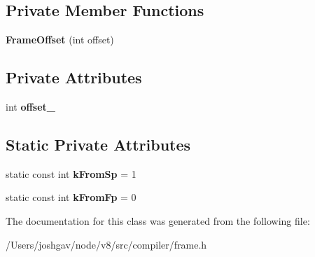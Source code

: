 \subsection*{Private Member Functions}
\begin{DoxyCompactItemize}
\item 
{\bfseries Frame\+Offset} (int offset)\hypertarget{classv8_1_1internal_1_1compiler_1_1_frame_offset_af4e4b2bb0e3c6df88aced1fdcfed68ff}{}\label{classv8_1_1internal_1_1compiler_1_1_frame_offset_af4e4b2bb0e3c6df88aced1fdcfed68ff}

\end{DoxyCompactItemize}
\subsection*{Private Attributes}
\begin{DoxyCompactItemize}
\item 
int {\bfseries offset\+\_\+}\hypertarget{classv8_1_1internal_1_1compiler_1_1_frame_offset_ae65fbe7ead773cd74c65bfcc71a61fb4}{}\label{classv8_1_1internal_1_1compiler_1_1_frame_offset_ae65fbe7ead773cd74c65bfcc71a61fb4}

\end{DoxyCompactItemize}
\subsection*{Static Private Attributes}
\begin{DoxyCompactItemize}
\item 
static const int {\bfseries k\+From\+Sp} = 1\hypertarget{classv8_1_1internal_1_1compiler_1_1_frame_offset_a76b301a59a61d610f7b9d41bd58b7dc1}{}\label{classv8_1_1internal_1_1compiler_1_1_frame_offset_a76b301a59a61d610f7b9d41bd58b7dc1}

\item 
static const int {\bfseries k\+From\+Fp} = 0\hypertarget{classv8_1_1internal_1_1compiler_1_1_frame_offset_a57b6cca3de02b5807c69770d4e8e8c6f}{}\label{classv8_1_1internal_1_1compiler_1_1_frame_offset_a57b6cca3de02b5807c69770d4e8e8c6f}

\end{DoxyCompactItemize}


The documentation for this class was generated from the following file\+:\begin{DoxyCompactItemize}
\item 
/\+Users/joshgav/node/v8/src/compiler/frame.\+h\end{DoxyCompactItemize}
